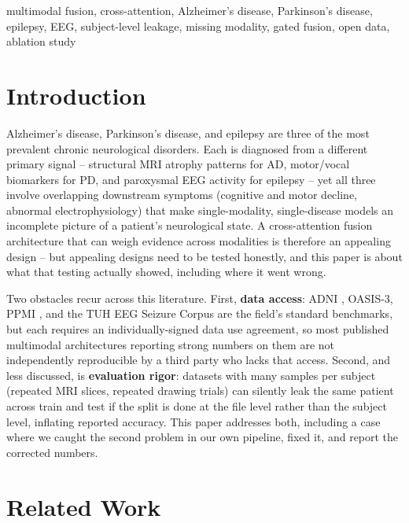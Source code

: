\documentclass[conference]{IEEEtran}
\begin{document}
\begin{IEEEkeywords}
multimodal fusion, cross-attention, Alzheimer's disease, Parkinson's
disease, epilepsy, EEG, subject-level leakage, missing modality, gated
fusion, open data, ablation study
\end{IEEEkeywords}

\section{Introduction}
\label{sec:intro}

Alzheimer's disease, Parkinson's disease, and epilepsy are three of the
most prevalent chronic neurological disorders. Each is diagnosed from a
different primary signal -- structural MRI atrophy patterns for AD,
motor/vocal biomarkers for PD, and paroxysmal EEG activity for epilepsy
-- yet all three involve overlapping downstream symptoms (cognitive and
motor decline, abnormal electrophysiology) that make single-modality,
single-disease models an incomplete picture of a patient's neurological
state. A cross-attention fusion architecture that can weigh evidence
across modalities is therefore an appealing design
\cite{vaswani2017attention,wei2025co_attention,shivahare2026attention} --
but appealing designs need to be tested honestly, and this paper is
about what that testing actually showed, including where it went wrong.

Two obstacles recur across this literature. First, \textbf{data access}:
ADNI \cite{jack2008adni}, OASIS-3, PPMI \cite{marek2011ppmi}, and the TUH
EEG Seizure Corpus \cite{shah2018tuh} are the field's standard
benchmarks, but each requires an individually-signed data use agreement,
so most published multimodal architectures reporting strong numbers on
them are not independently reproducible by a third party who lacks that
access. Second, and less discussed, is \textbf{evaluation
rigor}: datasets with many samples per subject (repeated MRI slices,
repeated drawing trials) can silently leak the same patient across train
and test if the split is done at the file level rather than the subject
level, inflating reported accuracy. This paper addresses both,
including a case where we caught the second problem in our own
pipeline, fixed it, and report the corrected numbers.

\section{Related Work}
\label{sec:related}
\end{document}
